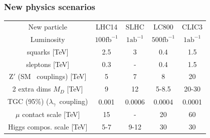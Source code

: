 \documentclass{beamer}
\begin{document}
\begin{frame}
\frametitle{New physics scenarios}
\begin{center}
{\scriptsize
 \begin{tabular}{ ccccc }
    \toprule
 New particle &     LHC14 & SLHC & LC800 & CLIC3\\
 Luminosity & $100\textrm{fb}^{-1}$ & $1\textrm{ab}^{-1}$&
 $500\textrm{fb}^{-1}$& $1\textrm{ab}^{-1}$\\
\midrule
squarks [TeV] &   2.5 & 3 & 0.4 & 1.5 \\
sleptons [TeV] &   0.3 & - & 0.4 & 1.5 \\ 
$\textrm{Z}'$ ({\tiny SM ~couplings}) [TeV]  &  5 & 7 & 8 & 20   \\ 
2 extra dims $M_D$ [TeV]  &    9 & 12 & 5-8.5 & 20-30 \\
TGC (95\%)  ({\tiny \rm $\lambda_{\gamma} $~coupling}) &   0.001& 0.0006& 0.0004& 0.0001 \\
$\mu$ contact scale [TeV] &  15& - & 20 & 60 \\
Higgs compos. scale [TeV] & 5-7 & 9-12 & 30 & 30\\
    \bottomrule
  \end{tabular}
  }
 \end{center}
\end{frame}
\end{document}
